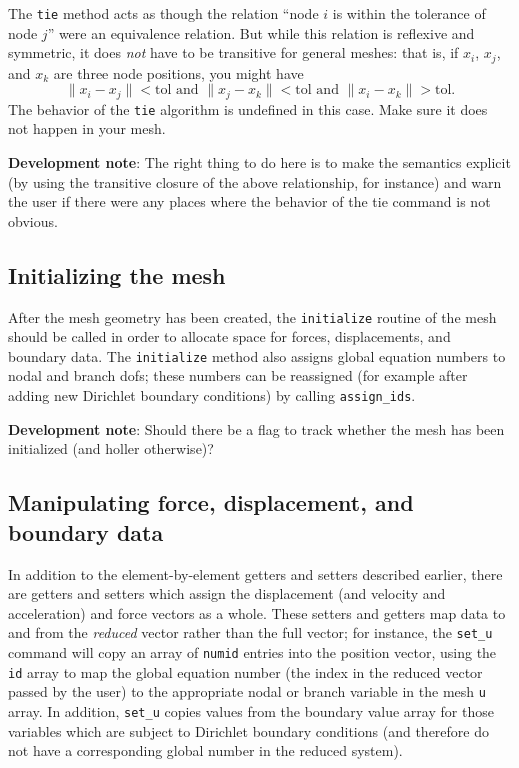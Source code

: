 \documentclass{article}
\newcommand{\devnote}[1]{%
  \begin{trivlist}
  \item\textbf{Development note}: #1
  \end{trivlist}}
\newcommand{\ttt}[1]{\texttt{#1}}
\begin{document}
The \ttt{tie} method acts as though the relation ``node $i$ is
within the tolerance of node $j$'' were an equivalence relation.  But
while this relation is reflexive and symmetric, it does \emph{not}
have to be transitive for general meshes: that is, if $x_i$, $x_j$,
and $x_k$ are three node positions, you might have
\[
  \|x_i - x_j\| < \mathrm{tol} \mbox{ and }
  \|x_j - x_k\| < \mathrm{tol} \mbox{ and }
  \|x_i - x_k\| > \mathrm{tol}.
\]
The behavior of the \ttt{tie} algorithm is undefined in this case.
Make sure it does not happen in your mesh.

\devnote{The right thing to do here is to make the semantics explicit
  (by using the transitive closure of the above relationship, for
  instance) and warn the user if there were any places where the
  behavior of the tie command is not obvious.}
  

\subsection{Initializing the mesh}

After the mesh geometry has been created, the \ttt{initialize}
routine of the mesh should be called in order to allocate space for
forces, displacements, and boundary data.  The \ttt{initialize}
method also assigns global equation numbers to nodal and branch dofs;
these numbers can be reassigned (for example after adding new
Dirichlet boundary conditions) by calling \ttt{assign\_ids}.

\devnote{Should there be a flag to track whether the mesh has been
  initialized (and holler otherwise)?}


\subsection{Manipulating force, displacement, and boundary data}

In addition to the element-by-element getters and setters described
earlier, there are getters and setters which assign the displacement
(and velocity and acceleration) and force vectors as a whole.  These
setters and getters map data to and from the \emph{reduced} vector
rather than the full vector; for instance, the \ttt{set\_u} command
will copy an array of \ttt{numid} entries into the position vector,
using the \ttt{id} array to map the global equation number (the
index in the reduced vector passed by the user) to the appropriate
nodal or branch variable in the mesh \ttt{u} array.  In addition,
\ttt{set\_u} copies values from the boundary value array for those
variables which are subject to Dirichlet boundary conditions (and
therefore do not have a corresponding global number in the reduced
system).
\end{document}
